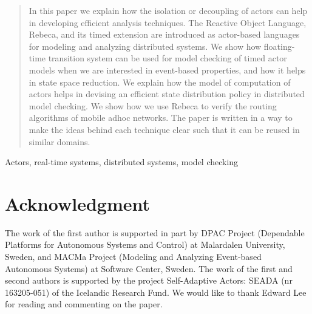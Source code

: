 \documentclass[conference]{IEEEtran}
\newcommand{\fixme}[1]{{\color{red}\textbf{FIXME:} #1}}
\begin{document}
	\begin{abstract}
	In this paper we explain how the isolation or decoupling of actors can help in developing efficient analysis techniques. The Reactive Object Language, Rebeca, and its timed extension are introduced as actor-based languages for modeling and analyzing distributed systems.
We show how floating-time transition system can be used for model checking of timed actor models when we are interested in event-based properties, and how it helps in state space reduction. We explain how the model of computation of actors helps in devising an efficient state distribution policy in distributed model checking. We show how we use Rebeca to  verify the routing algorithms of mobile adhoc networks. The paper is written in a way to make the ideas behind each technique clear such that it can be reused in similar domains.
		
	\end{abstract}
	
	\begin{IEEEkeywords}
		Actors, real-time  systems, distributed systems, model checking\end{IEEEkeywords}
	

%
%
%





	
	
	
	\section*{Acknowledgment}
	The work of the first author is supported in part by DPAC Project (Dependable Platforms for
Autonomous Systems and Control) at Malardalen University, Sweden, and MACMa Project (Modeling and Analyzing Event-based Autonomous Systems) at Software Center, Sweden. The work of the first and second authors is supported by the
project Self-Adaptive Actors: SEADA (nr 163205-051) of the Icelandic Research
Fund. We would like to thank Edward Lee for reading and commenting on the paper.
	
	
	
	
	\balance
\end{document}
